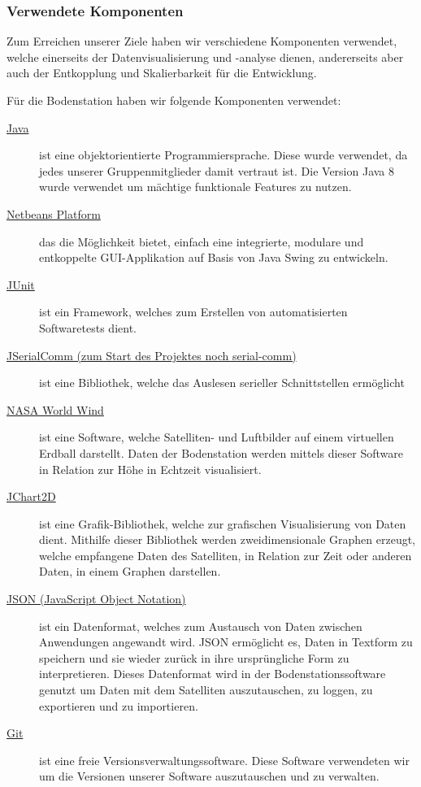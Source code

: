 \subsubsection{Verwendete Komponenten}
Zum Erreichen unserer Ziele haben wir verschiedene Komponenten verwendet, welche einerseits der Datenvisualisierung und -analyse dienen, andererseits aber auch der Entkopplung und Skalierbarkeit für die Entwicklung.

Für die Bodenstation haben wir folgende Komponenten verwendet:
\begin{description}
	\item[\href{http://www.oracle.com/technetwork/java/javase/downloads/jdk8-downloads-2133151.html}{Java}] ist eine objektorientierte Programmiersprache. Diese wurde verwendet, da jedes unserer Gruppenmitglieder damit vertraut ist. Die Version Java 8 wurde verwendet um mächtige funktionale Features zu nutzen.
	\item[\href{https://netbeans.org/features/platform/}{Netbeans Platform}] das die Möglichkeit bietet, einfach eine integrierte, modulare und entkoppelte GUI-Applikation auf Basis von Java Swing zu entwickeln.
	\item[\href{http://junit.org/}{JUnit}] ist ein Framework, welches zum Erstellen von automatisierten Softwaretests dient.
	\item[\href{http://fazecast.github.io/jSerialComm/}{JSerialComm (zum Start des Projektes noch serial-comm)}] ist eine Bibliothek, welche das Auslesen serieller Schnittstellen ermöglicht 
	\item[\href{http://worldwind.arc.nasa.gov/java/}{NASA World Wind}] ist eine Software, welche Satelliten- und Luftbilder auf einem virtuellen Erdball darstellt. Daten der Bodenstation werden mittels dieser Software in Relation zur Höhe in Echtzeit visualisiert.
	\item[\href{http://jchart2d.sourceforge.net/}{JChart2D}] ist eine Grafik-Bibliothek, welche zur grafischen Visualisierung von Daten dient. Mithilfe dieser Bibliothek werden zweidimensionale Graphen erzeugt, welche empfangene Daten des Satelliten, in Relation zur Zeit oder anderen Daten, in einem Graphen darstellen.
	\item[\href{http://www.json.org/}{JSON (JavaScript Object Notation)}] ist ein Datenformat, welches zum Austausch von Daten zwischen Anwendungen angewandt wird. JSON ermöglicht es, Daten in Textform zu speichern und sie wieder zurück in ihre ursprüngliche Form zu interpretieren. Dieses Datenformat wird in der Bodenstationssoftware genutzt um Daten mit dem Satelliten auszutauschen, zu loggen, zu exportieren und zu importieren.
	\item[\href{http://git-scm.com/}{Git}] ist eine freie Versionsverwaltungssoftware. Diese Software verwendeten wir um die Versionen unserer Software auszutauschen und zu verwalten.
\end{description}